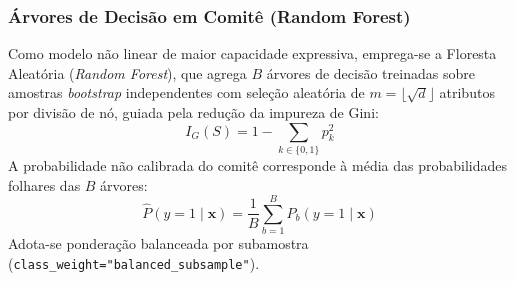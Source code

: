 \documentclass[conference]{IEEEtran}
\begin{document}
\subsubsection{Árvores de Decisão em Comitê (Random Forest)}
Como modelo não linear de maior capacidade expressiva, emprega-se a Floresta Aleatória (\textit{Random Forest}), que agrega $B$ árvores de decisão treinadas sobre amostras \textit{bootstrap} independentes com seleção aleatória de $m = \lfloor\sqrt{d}\rfloor$ atributos por divisão de nó, guiada pela redução da impureza de Gini:
\begin{equation}
    I_G(S) = 1 - \sum_{k \in \{0, 1\}} p_k^2
\end{equation}
A probabilidade não calibrada do comitê corresponde à média das probabilidades folhares das $B$ árvores:
\begin{equation}
    \hat{P}(y=1 \mid \mathbf{x}) = \frac{1}{B} \sum_{b=1}^{B} P_b(y=1 \mid \mathbf{x})
\end{equation}
Adota-se ponderação balanceada por subamostra (\texttt{class\_weight="balanced\_subsample"}).
\end{document}
